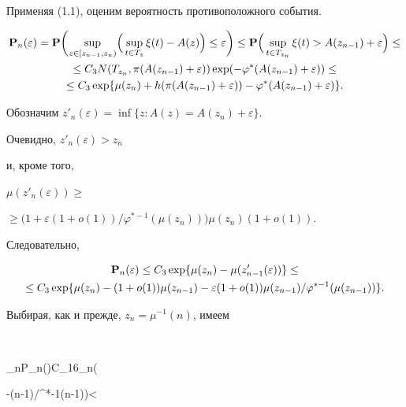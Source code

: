 Применяя (1.1), оценим вероятность противоположного события. 


\begin{gather*} 


{\bold P}_n(\varepsilon)={\bold P}\biggl(\sup_{z\in[z_{n-1},z_n)} 


\Bigl(\,\sup_{t\in T_z}\xi(t)-A(z)\Bigr)\le\varepsilon\biggr)\le 


{\bold P}\Bigl(\,\sup_{t\in T_{z_n}}\xi(t)>A(z_{n-1})+\varepsilon\Bigr) 


\le\\ 


\le C_3N(T_{z_n},\pi(A(z_{n-1})+\varepsilon)) 


\exp(-\varphi^*(A(z_{n-1})+\varepsilon))\le \\ 


\le C_3\exp\{\mu(z_n)+h(\pi(A(z_{n-1})+\varepsilon)) 


-\varphi^*(A(z_{n-1})+\varepsilon)\}. 


\end{gather*} 


Обозначим $z'_n(\varepsilon)=\inf\{z:A(z)=A(z_n)+\varepsilon\}$. 


Очевидно, $z'_n(\varepsilon)>z_n$ 


и, кроме того, 


$\mu(z'_n(\varepsilon))\ge$\linebreak %


$\ge\bigl(1+\varepsilon(1+o(1))/\varphi^{*-1} 


(\mu(z_n))\bigr)\mu(z_n)(1+o(1))$. 


Следовательно, 


\begin{gather*} 


{\bold P}_n(\varepsilon)\le C_3\exp\{\mu(z_n)-\mu(z'_{n-1} 


(\varepsilon))\}\le \\ 


\le C_3\exp\{\mu(z_n)-(1+o(1))\mu(z_{n-1})-\varepsilon(1+o(1)) 


\mu(z_{n-1})/\varphi^{*-1}(\mu(z_{n-1}))\}. 


\end{gather*} 


Выбирая, как и прежде, $z_n=\mu^{-1}(n)$, имеем 


$$ 


\sum_n{\bold P}_n(\varepsilon)\le C_{16}\sum_n\exp\bigl( 


-\varepsilon(n-1)/\varphi^{*-1}(n-1)\bigr)<\infty 


